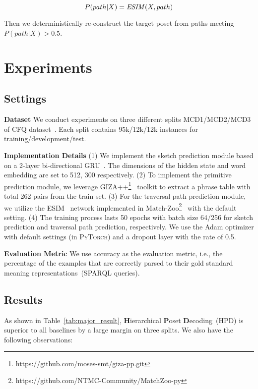 \documentclass{article}
\begin{document}
\begin{equation}
P(path|X) = \text{\emph{ESIM}}(X, path)
\end{equation}

Then we deterministically re-construct the target poset from paths meeting $P(path|X)>0.5$.







\section{Experiments}
\subsection{Settings}
\textbf{Dataset}
We conduct experiments on three different splits MCD1/MCD2/MCD3 of CFQ dataset~\citep{keysers2020measuring}.
Each split contains 95k/12k/12k instances for training/development/test.

\textbf{Implementation Details}
(1) We implement the sketch prediction module based on a 2-layer bi-directional GRU~\citep{cho-etal-2014-learning}. The dimensions of the hidden state and word embedding are set to 512, 300 respectively.
(2) To implement the primitive prediction module,  we leverage \textsc{GIZA++}\footnote{https://github.com/moses-smt/giza-pp.git}~ \citep{och03:asc} toolkit to extract a phrase table with total 262 pairs from the train set.
(3) For the traversal path prediction module, we utilize the ESIM~\citep{chen2016enhanced} network implemented in Match-Zoo\footnote{https://github.com/NTMC-Community/MatchZoo-py}~\citep{Guo:2019:MLP:3331184.3331403} with the default setting.
(4) The training  process lasts 50 epochs with batch size 64/256 for sketch prediction and traversal path prediction, respectively. We use the Adam optimizer with default settings (in \textsc{PyTorch}) and a dropout layer with the rate of 0.5. 

\textbf{Evaluation Metric}
We use accuracy as the evaluation metric, i.e., the percentage of the examples that are correctly parsed to their gold standard meaning  representations~(SPARQL queries).



\subsection{Results}
As shown in Table~\ref{tab:major_result}, \textbf{H}ierarchical \textbf{P}oset \textbf{D}ecoding~(HPD) is superior to all baselines by a large margin on three splits. We also have the following observations:
\end{document}

